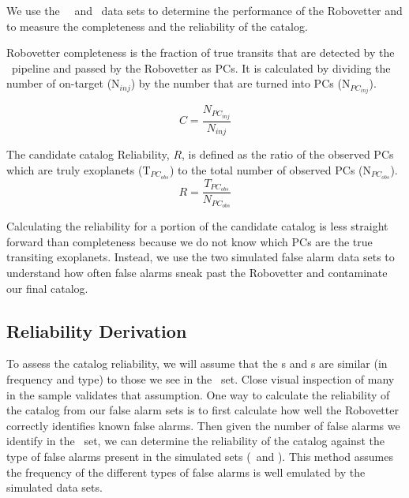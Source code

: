 

\newcommand{\opsfp}{N$_{FP_{obs}}$}
\newcommand{\opspc}{N$_{PC_{obs}}$}
\newcommand{\opsN}{N$_{obs}$}
\newcommand{\trueopspc}{T$_{PC_{obs}}$}
\newcommand{\missedfp}{T$_{FP_{obs}}$ - N$_{FP_{obs}}$}
\newcommand{\invfp}{N$_{FP_{inv}}$}
\newcommand{\invpc}{N$_{PC_{inv}}$}
\newcommand{\invN}{N$_{inv}$}
\newcommand{\sfatce}{SFA-TCE}


We use the \injtce\, \scrtce\ and \invtce\ data sets to determine the performance of the Robovetter and to measure the completeness and the reliability of the catalog. 

Robovetter completeness is the fraction of true transits that are detected by the \Kepler\ pipeline and passed by the Robovetter as PCs.  It is calculated by dividing the number of on-target  (N$_{inj}$) by the number that are turned into PCs (N$_{PC_{inj}}$). 

\begin{equation}
\label{comp}
C = \frac{N_{PC_{inj}}}{N_{inj}}
\end{equation}

The candidate catalog Reliability, $R$, is defined as the ratio of the observed PCs which are truly exoplanets (\trueopspc) to the total number of observed PCs (\opspc). 
\begin{equation}
\label{eq:rel}
R = \frac{T_{PC_{obs}}}{N_{PC_{obs}}}
\end{equation}

Calculating the reliability for a portion of the candidate catalog is less straight forward than completeness because we do not know which PCs are the true transiting exoplanets. Instead, we use the two simulated false alarm data sets to understand how often false alarms sneak past the Robovetter and contaminate our final catalog.


\subsection{Reliability Derivation}
\label{s:relcalc}
To assess the catalog reliability, we will assume that the \scrtce s and \invtce s are similar (in frequency and type) to those we see in the \opstce\ set. Close visual inspection of many in the sample validates that assumption. One way to calculate the reliability of the catalog from our false alarm sets is to first calculate how well the Robovetter correctly identifies known false alarms.  Then given the number of false alarms we identify in the \opstce\ set, we can determine the reliability of the catalog against the type of false alarms present in the simulated sets (\invtce\ and \scrtce). This method assumes the frequency of the different types of false alarms is well emulated by the simulated data sets. 


